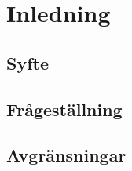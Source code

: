 \section{Inledning}

	\subsection{Syfte}

	\subsection{Frågeställning}
	
	\subsection{Avgränsningar}

	